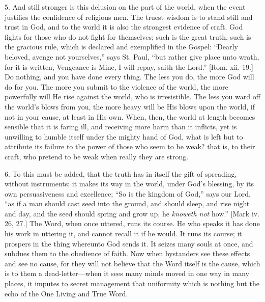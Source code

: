 5. And still stronger is this delusion on the part of the world,
when the event justifies the confidence of religious men. The truest
wisdom is to stand still and trust in God, and to the world it is also
the strongest evidence of craft. God fights for those who do not fight
for themselves; such is the great truth, such is the gracious rule,
which is declared and exemplified in the Gospel: ``Dearly beloved,
avenge not yourselves,'' says St. Paul, ``but rather give
place unto wrath, for it is written, Vengeance is Mine, I will repay,
saith the Lord.'' [Rom. xii. 19.] Do nothing, and you have done
every thing. The less you do, the more God will do for you. The more
you submit to the violence of the world, the more powerfully will He
rise against the world, who is irresistible. The less you ward off the
world's blows from you, the more heavy will be His blows upon the
world, if not in your cause, at least in His own. When, then, the
world at length becomes sensible that it is faring ill, and receiving
more harm than it inflicts, yet is unwilling to humble itself under
the mighty hand of God, what is left but to attribute its failure to
the power of those who seem to be weak? that is, to their craft, who
pretend to be weak when really they are strong.

6. To this must be added, that the truth has in itself the gift of
spreading, without instruments; it makes its way in the world, under
God's blessing, by its own persuasiveness and excellence; ``So is
the kingdom of God,'' says our Lord, ``as if a man should cast
seed into the ground, and should sleep, and rise night and day, and
the seed should spring and grow up, he \emph{knoweth not} how.''
[Mark iv. 26, 27.] The Word, when once uttered, runs its course. He
who speaks it has done his work in uttering it, and cannot recall it
if he would. It runs its course; it prospers in the thing whereunto
God sends it. It seizes many souls at once, and subdues them to the
obedience of faith. Now when bystanders see these effects and see no
cause, for they will not believe that the Word itself is the cause,
which is to them a dead-letter—when it sees many minds moved in one
way in many places, it imputes to secret management that uniformity
which is nothing but the echo of the One Living and True Word.

